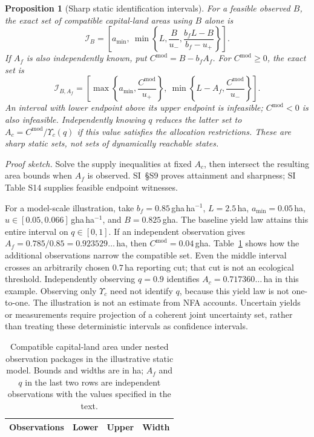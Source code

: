 \documentclass[preprint,12pt,authoryear]{elsarticle}
\newtheorem{proposition}{Proposition}
\newcommand{\Ups}{\Upsilon_c}
\begin{document}
\begin{proposition}[Sharp static identification intervals]\label{prop:c13ident}
For a feasible observed $B$, the exact set of compatible capital-land areas using $B$ alone is
\begin{equation}\label{eq:c13boundsB}
\mathcal I_B=\left[a_{\min},\ \min\left\{L,\frac{B}{u_-},\frac{b_fL-B}{b_f-u_+}\right\}\right].
\end{equation}
If $A_f$ is also independently known, put $C^{\mathrm{mod}}=B-b_fA_f$. For $C^{\mathrm{mod}}\ge0$, the exact set is
\begin{equation}\label{eq:c13boundsAf}
\mathcal I_{B,A_f}=\left[\max\left\{a_{\min},\frac{C^{\mathrm{mod}}}{u_+}\right\},\ \min\left\{L-A_f,\frac{C^{\mathrm{mod}}}{u_-}\right\}\right].
\end{equation}
An interval with lower endpoint above its upper endpoint is infeasible; $C^{\mathrm{mod}}<0$ is also infeasible. Independently knowing $q$ reduces the latter set to $A_c=C^{\mathrm{mod}}/\Ups(q)$ if this value satisfies the allocation restrictions. These are sharp static sets, not sets of dynamically reachable states.
\end{proposition}
\noindent\emph{Proof sketch.} Solve the supply inequalities at fixed $A_c$, then intersect the resulting area bounds when $A_f$ is observed. SI~\S S9 proves attainment and sharpness; SI Table S14 supplies feasible endpoint witnesses.

For a model-scale illustration, take $b_f=0.85$\,gha\,ha$^{-1}$, $L=2.5$\,ha, $a_{\min}=0.05$\,ha, $u\in[0.05,0.066]$\,gha\,ha$^{-1}$, and $B=0.825$\,gha. The baseline yield law attains this entire interval on $q\in[0,1]$. If an independent observation gives $A_f=0.785/0.85=0.923529\ldots$\,ha, then $C^{\mathrm{mod}}=0.04$\,gha. Table~\ref{tab:c13bounds} shows how the additional observations narrow the compatible set. Even the middle interval crosses an arbitrarily chosen $0.7$\,ha reporting cut; that cut is not an ecological threshold. Independently observing $q=0.9$ identifies $A_c=0.717360\ldots$\,ha in this example. Observing only $\Ups$ need not identify $q$, because this yield law is not one-to-one. The illustration is not an estimate from NFA accounts. Uncertain yields or measurements require projection of a coherent joint uncertainty set, rather than treating these deterministic intervals as confidence intervals.

\begin{table}[htbp]
\centering\small
\caption{Compatible capital-land area under nested observation packages in the illustrative static model. Bounds and widths are in ha; $A_f$ and $q$ in the last two rows are independent observations with the values specified in the text.}
\label{tab:c13bounds}
\begin{tabular}{lrrr}
\toprule
Observations & Lower & Upper & Width \\
\midrule

\end{tabular}
\end{table}
\end{document}
